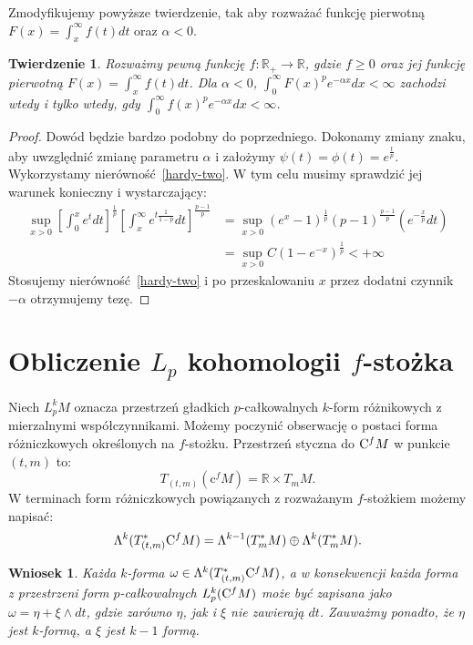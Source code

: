 \documentclass[licencjacka]{pracamgr}
\theoremstyle{definition}
\theoremstyle{definition}
\theoremstyle{plain}
\theoremstyle{plain}
\theoremstyle{plain}
\newtheorem{theorem}{Twierdzenie}[section]
\theoremstyle{plain}
\theoremstyle{plain}
\newtheorem{wniosek}{Wniosek}[section]
\def\cfm{\ensuremath\mathrm{C}^fM}
\def\M{\ensuremath M}
\begin{document}
Zmodyfikujemy powyższe twierdzenie, tak aby rozważać funkcję pierwotną
$F(x) = \int_x^\infty f(t) dt $ oraz $\alpha < 0$.

\begin{theorem}
  Rozważmy pewną funkcję $f: \mathbb{R}_{+} \rightarrow \mathbb{R}$, gdzie
  $f \geq 0$
  oraz jej funkcję pierwotną $F(x) = \int_x^\infty f(t) dt$. Dla $\alpha < 0$,
 $\int_0^\infty F(x)^pe^{- \alpha x}dx < \infty$
zachodzi wtedy i tylko wtedy, gdy
$\int_0^\infty f(x)^p e^{-\alpha x}dx < \infty$.
\end{theorem}
\begin{proof}
  Dowód będzie bardzo podobny do poprzedniego. Dokonamy zmiany znaku,
  aby uwzględnić zmianę parametru $\alpha$ i 
 założymy $\psi(t) = \phi(t) =
 e^{ \frac{t}{p} }$.
 Wykorzystamy nierówność~\ref{hardy-two}. W tym celu musimy sprawdzić
 jej warunek konieczny i wystarczający:
 \begin{align*}
\sup_{x > 0}
\left[
\int_0^x e^t dt
\right]^{\frac{1}{p}}
\left[
\int_x^\infty
    e^{t \frac{1}{1-p}} dt
\right]^{\frac{p-1}{p}}
&=
\sup_{x > 0}
\left(
  e^x - 1
\right)^{\frac{1}{p}}
(p-1)^{\frac{p-1}{p}}
\left(
    e^{ - \frac{x}{p}} dt
\right) \\
& = 
\sup_{x > 0} C
\left(
  1 - e^{-x}
\right)^{\frac{1}{p}} < +\infty
 \end{align*}
 Stosujemy nierówność~\ref{hardy-two} i po przeskalowaniu $x$ przez
 dodatni czynnik $-\alpha$ otrzymujemy tezę.
\end{proof}

\section{Obliczenie $L_p$ kohomologii $f$-stożka}


Niech $L_p^k M$ oznacza przestrzeń gładkich $p$-całkowalnych 
$k$-form różnikowych z mierzalnymi  współczynnikami.
Możemy poczynić obserwację o postaci forma różniczkowych określonych na 
$f$-stożku. Przestrzeń styczna do $\cfm$ w punkcie $(t, m)$ to:
\[
    T_{(t, m)} (\mathrm{c}^f M) = \mathbb{R} \times T_m M.
\]
W terminach form różniczkowych powiązanych z rozważanym $f$-stożkiem możemy
napisać:
\[
\Lambda^k( T_{(t,m)}^\ast \cfm) = 
\Lambda^{k-1}(T_{m}^\ast\M)  \oplus \Lambda^k(T_{m}^\ast\M).
\]

\begin{wniosek}
  Każda $k$-forma $\omega \in \Lambda^k( T_{(t,m)}^\ast \cfm)$, 
a w konsekwencji każda forma z przestrzeni form $p$-całkowalnych  $L_p^k
(\cfm)$ może być zapisana jako $\omega = \eta + \xi \wedge dt$,
gdzie zarówno $\eta$, jak i  $\xi$ nie zawierają $dt$.  Zauważmy ponadto,
że $\eta$ jest $k$-formą, a $\xi$ jest $k-1$ formą. \\
\end{wniosek}
\end{document}
